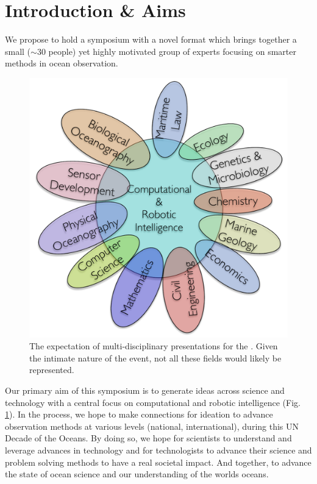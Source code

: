 \section{Introduction \& Aims}
\label{sec:intro}



\noindent
We propose to hold a symposium with a novel format which brings
together a small ($\sim 30$ people) yet highly motivated group of
experts focusing on smarter methods in ocean observation.%

\begin{figure}
  \vspace{-0.5cm}
  \centering 
  \includegraphics[scale=0.4]{fig/disciplines.pdf}
  \caption{The expectation of multi-disciplinary presentations for the
    \sympe. Given the intimate nature of the event, not all these
    fields would likely be represented.}
  \label{fig:concept}
  \vspace{-0.5cm}
\end{figure}

Our primary aim of this symposium is to generate ideas across science
and technology with a central focus on computational and robotic
intelligence (Fig. \ref{fig:concept}).  In the process, we hope to
make connections for ideation to advance observation methods at
various levels (national, international), during this \textsf{UN
  Decade of the Oceans}. By doing so, we hope for scientists to
understand and leverage advances in technology and for technologists
to advance their science and problem solving methods to have a real
societal impact. And together, to advance the state of ocean science
and our understanding of the worlds oceans.


